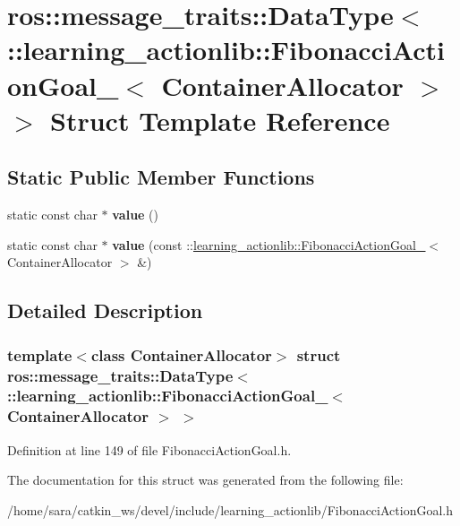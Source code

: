 \hypertarget{structros_1_1message__traits_1_1DataType_3_01_1_1learning__actionlib_1_1FibonacciActionGoal___3_01ContainerAllocator_01_4_01_4}{}\section{ros\+:\+:message\+\_\+traits\+:\+:Data\+Type$<$ \+:\+:learning\+\_\+actionlib\+:\+:Fibonacci\+Action\+Goal\+\_\+$<$ Container\+Allocator $>$ $>$ Struct Template Reference}
\label{structros_1_1message__traits_1_1DataType_3_01_1_1learning__actionlib_1_1FibonacciActionGoal___3_01ContainerAllocator_01_4_01_4}
\subsection*{Static Public Member Functions}
\begin{DoxyCompactItemize}
\item 
\mbox{\label{structros_1_1message__traits_1_1DataType_3_01_1_1learning__actionlib_1_1FibonacciActionGoal___3_01ContainerAllocator_01_4_01_4_a21d5057e089b5aba1d50f78fcf80ce15}} 
static const char $\ast$ {\bfseries value} ()
\item 
\mbox{\label{structros_1_1message__traits_1_1DataType_3_01_1_1learning__actionlib_1_1FibonacciActionGoal___3_01ContainerAllocator_01_4_01_4_a1c7469079c1a2a33318357d17ea80a59}} 
static const char $\ast$ {\bfseries value} (const \+::\hyperlink{structlearning__actionlib_1_1FibonacciActionGoal__}{learning\+\_\+actionlib\+::\+Fibonacci\+Action\+Goal\+\_\+}$<$ Container\+Allocator $>$ \&)
\end{DoxyCompactItemize}


\subsection{Detailed Description}
\subsubsection*{template$<$class Container\+Allocator$>$\newline
struct ros\+::message\+\_\+traits\+::\+Data\+Type$<$ \+::learning\+\_\+actionlib\+::\+Fibonacci\+Action\+Goal\+\_\+$<$ Container\+Allocator $>$ $>$}



Definition at line 149 of file Fibonacci\+Action\+Goal.\+h.



The documentation for this struct was generated from the following file\+:\begin{DoxyCompactItemize}
\item 
/home/sara/catkin\+\_\+ws/devel/include/learning\+\_\+actionlib/Fibonacci\+Action\+Goal.\+h\end{DoxyCompactItemize}
